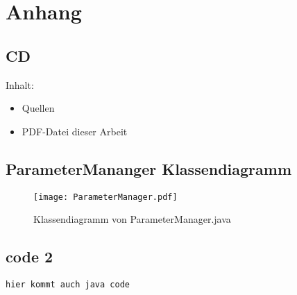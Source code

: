 
\chapter{Anhang}

		
\section{CD}
Inhalt:
\begin{itemize}
\item Quellen
\item PDF-Datei dieser Arbeit
\end{itemize}

\newpage


\section{ParameterMananger Klassendiagramm}\label{A.PM.Diagramm}
\begin{figure}[h!]
  \begin{center}
    \texttt{[image: ParameterManager.pdf]}
  		  \caption{Klassendiagramm von ParameterManager.java}
     \label{ttn.DoorsConnetor}
  \end{center}
\end{figure}

\newpage
\section{code 2}\label{code2}

		
\begin{lstlisting}	
hier kommt auch java code

\end{lstlisting}